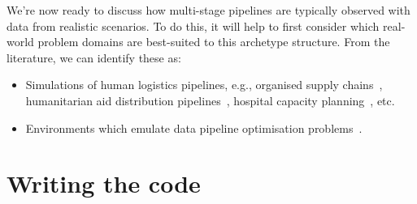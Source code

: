 We're now ready to discuss how multi-stage pipelines are typically observed with data from realistic scenarios. To do this, it will help to first consider which real-world problem domains are best-suited to this archetype structure. From the literature, we can identify these as:
\begin{itemize}
\item{Simulations of human logistics pipelines, e.g., organised supply chains~\cite{yan2022reinforcement}, humanitarian aid distribution pipelines~\cite{yu2021reinforcement}, hospital capacity planning~\cite{shuvo2021deep}, etc. }
\item{Environments which emulate data pipeline optimisation problems~\cite{nagrecha2023intune}.}
\end{itemize}

\section{\sffamily Writing the code}
